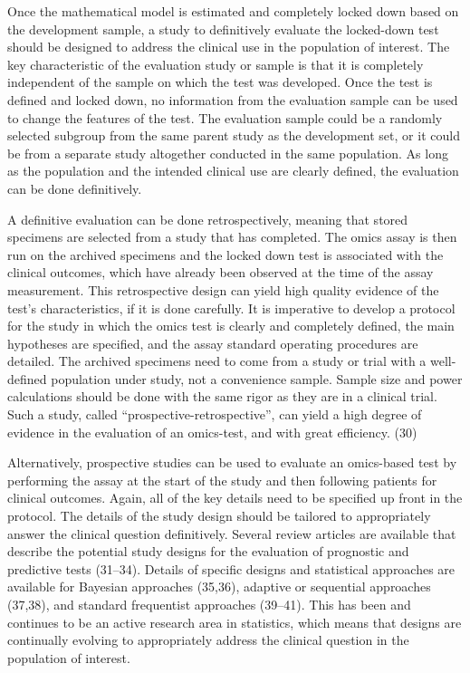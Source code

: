 \documentclass[11pt]{article}
\begin{document}
Once the mathematical model is estimated and completely locked down
based on the development sample, a study to definitively evaluate the
locked-down test should be designed to address the clinical use in the
population of interest. The key characteristic of the evaluation study
or sample is that it is completely independent of the sample on which
the test was developed. Once the test is defined and locked down, no
information from the evaluation sample can be used to change the
features of the test. The evaluation sample could be a randomly selected
subgroup from the same parent study as the development set, or it could
be from a separate study altogether conducted in the same population. As
long as the population and the intended clinical use are clearly
defined, the evaluation can be done definitively.

A definitive evaluation can be done retrospectively, meaning that stored
specimens are selected from a study that has completed. The omics assay
is then run on the archived specimens and the locked down test is
associated with the clinical outcomes, which have already been observed
at the time of the assay measurement. This retrospective design can
yield high quality evidence of the test's characteristics, if it is done
carefully. It is imperative to develop a protocol for the study in which
the omics test is clearly and completely defined, the main hypotheses
are specified, and the assay standard operating procedures are detailed.
The archived specimens need to come from a study or trial with a
well-defined population under study, not a convenience sample. Sample
size and power calculations should be done with the same rigor as they
are in a clinical trial. Such a study, called
``prospective-retrospective'', can yield a high degree of evidence in
the evaluation of an omics-test, and with great efficiency. (30)

Alternatively, prospective studies can be used to evaluate an
omics-based test by performing the assay at the start of the study and
then following patients for clinical outcomes. Again, all of the key
details need to be specified up front in the protocol. The details of
the study design should be tailored to appropriately answer the clinical
question definitively. Several review articles are available that
describe the potential study designs for the evaluation of prognostic
and predictive tests (31--34). Details of specific designs and
statistical approaches are available for Bayesian approaches (35,36),
adaptive or sequential approaches (37,38), and standard frequentist
approaches (39--41). This has been and continues to be an active
research area in statistics, which means that designs are continually
evolving to appropriately address the clinical question in the
population of interest.
\end{document}
